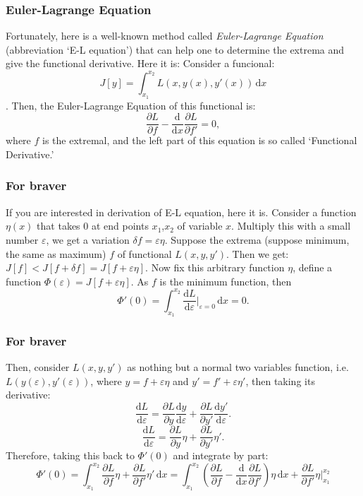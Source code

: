 \documentclass[compress]{beamer}
\begin{document}
\begin{frame}
  \frametitle{Euler-Lagrange Equation}
  Fortunately, here is a well-known method called \emph{Euler-Lagrange Equation} (abbreviation `E-L equation') that can help one to determine the extrema and give the functional derivative.
  Here it is:
  \bigbreak
  Consider a funcional: \[J\left[ y \right] = \int_{x_1}^{x_2} L(x,y(x),y'(x))\,\mathrm{d}x\].
  Then, the Euler-Lagrange Equation of this functional is:
  \[\frac{\partial L}{\partial f} - \frac{\mathrm{d}}{\mathrm{d} x}\frac{\partial L}{\partial f'}=0,\]
  where \(f\) is the extremal, and the left part of this equation is so called `Functional Derivative.'
\end{frame}

\begin{frame}
  \frametitle{For braver}
  If you are interested in derivation of E-L equation, here it is.
  \bigbreak
  Consider a function \(\eta(x)\) that takes \(0\) at end points \(x_1\),\(x_2\) of variable \(x\). Multiply this with a small number \(\varepsilon\),
  we get a variation \(\delta f = \varepsilon\eta\). Suppose the extrema (suppose minimum, the same as maximum)
  \(f\) of functional \(L(x,y,y')\). Then we get:
  \(J\left[ f \right] < J\left[ f+\delta f \right] = J\left[ f+\varepsilon\eta \right]\).
  Now fix this arbitrary function \(\eta\), define a function \(\Phi\left( \varepsilon \right) = J\left[ f+\varepsilon\eta \right].\)
  As \(f\) is the minimum function, then
  \[\Phi'\left( 0 \right) = \int_{x_1}^{x_2} \frac{\mathrm{d} L}{\mathrm{d} \varepsilon}\Big|_{\varepsilon= 0}  \,\mathrm{d}x = 0.\]

\end{frame}

\begin{frame}
  \frametitle{For braver}
  Then, consider \(L(x,y,y')\) as nothing but a normal two variables function, i.e. \(L(y(\varepsilon),y'(\varepsilon))\), where \(y = f+\varepsilon\eta\) and \(y' = f'+\varepsilon\eta'\), then taking its derivative:
  \[\frac{\mathrm{d} L}{\mathrm{d} \varepsilon} = \frac{\partial L}{\partial y}\frac{\mathrm{d} y}{\mathrm{d} \varepsilon}+\frac{\partial L}{\partial y'}\frac{\mathrm{d} y'}{\mathrm{d} \varepsilon}.\]
  \[\frac{\mathrm{d} L}{\mathrm{d} \varepsilon} = \frac{\partial L}{\partial y}\eta+\frac{\partial L}{\partial y'}\eta'.\]
  Therefore, taking this back to \(\Phi'(0)\) and integrate by part:
  \[\Phi'\left( 0 \right) = \int_{x_1}^{x_2} \frac{\partial L}{\partial f}\eta+\frac{\partial L}{\partial f'}\eta'\,\mathrm{d}x =
    \int_{x_1}^{x_2} \left( \frac{\partial L}{\partial f}-\frac{\mathrm{d} }{\mathrm{d} x}\frac{\partial L}{\partial f'} \right)\eta\,\mathrm{d}x+\frac{\partial L}{\partial f'}\eta\Big|_{x_1}^{x_2}\]
\end{frame}
\end{document}
